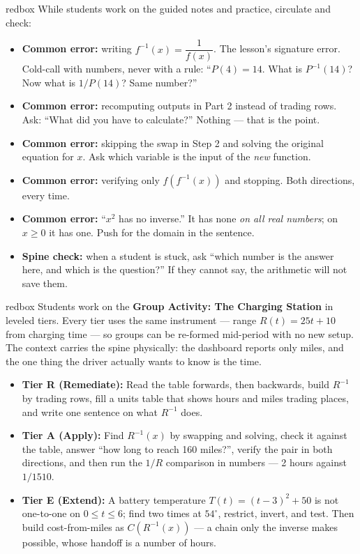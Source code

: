 \documentclass[10pt]{article}
\begin{document}
\begin{skillbox}{redbox}
While students work on the guided notes and practice, circulate and check:
\begin{itemize}
  \item \textbf{Common error:} writing $f^{-1}(x) = \dfrac{1}{f(x)}$. The
        lesson's signature error. Cold-call with numbers, never with a rule:
        ``$P(4) = 14$. What is $P^{-1}(14)$? Now what is $1/P(14)$? Same
        number?''
  \item \textbf{Common error:} recomputing outputs in Part 2 instead of trading
        rows. Ask: ``What did you have to calculate?'' Nothing --- that is the
        point.
  \item \textbf{Common error:} skipping the swap in Step 2 and solving the
        original equation for $x$. Ask which variable is the input of the
        \textit{new} function.
  \item \textbf{Common error:} verifying only $f(f^{-1}(x))$ and stopping. Both
        directions, every time.
  \item \textbf{Common error:} ``$x^2$ has no inverse.'' It has none
        \textit{on all real numbers}; on $x \ge 0$ it has one. Push for the
        domain in the sentence.
  \item \textbf{Spine check:} when a student is stuck, ask ``which number is
        the answer here, and which is the question?'' If they cannot say, the
        arithmetic will not save them.
\end{itemize}
\end{skillbox}

\begin{skillbox}{redbox}
Students work on the \textbf{Group Activity: The Charging Station} in leveled
tiers. Every tier uses the same instrument --- range $R(t) = 25t + 10$ from
charging time --- so groups can be re-formed mid-period with no new setup. The
context carries the spine physically: the dashboard reports only miles, and the
one thing the driver actually wants to know is the time.

\begin{itemize}
  \item \textbf{Tier R (Remediate):} Read the table forwards, then backwards,
        build $R^{-1}$ by trading rows, fill a units table that shows hours and
        miles trading places, and write one sentence on what $R^{-1}$ does.
  \item \textbf{Tier A (Apply):} Find $R^{-1}(x)$ by swapping and solving,
        check it against the table, answer ``how long to reach 160 miles?'',
        verify the pair in both directions, and then run the $1/R$ comparison in
        numbers --- 2 hours against $1/1510$.
  \item \textbf{Tier E (Extend):} A battery temperature $T(t) = (t-3)^2 + 50$
        is not one-to-one on $0 \le t \le 6$; find two times at $54^\circ$,
        restrict, invert, and test. Then build cost-from-miles as
        $C(R^{-1}(x))$ --- a chain only the inverse makes possible, whose
        handoff is a number of hours.
\end{itemize}
\end{skillbox}
\end{document}
